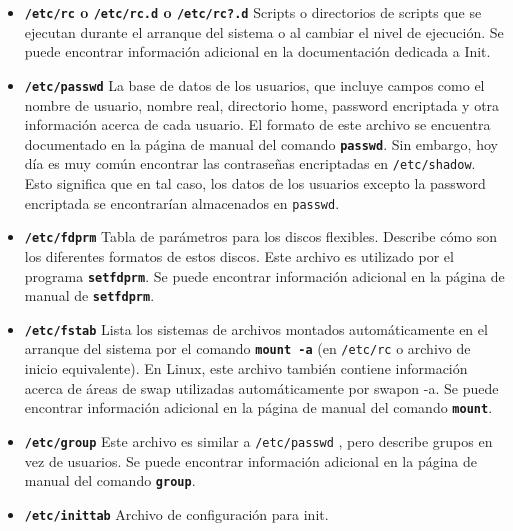 \begin{itemize} 

\item \textbf{\texttt{/etc/rc} o
\texttt{/etc/rc.d} o \texttt{/etc/rc?.d}}
 Scripts o directorios de scripts que se ejecutan durante el
arranque del sistema o  al cambiar el nivel de ejecución. Se puede
encontrar información adicional en la documentación dedicada a Init.


\item \textbf{\texttt{/etc/passwd}}
 La base de datos de los usuarios, que incluye campos como el
nombre de usuario, nombre real, directorio home, password encriptada y otra
información acerca de cada usuario.  El formato de este archivo se encuentra
documentado en la página de manual del comando \texttt{\textbf{passwd}}. 
	 Sin embargo, hoy día es muy común encontrar las contraseñas encriptadas
	 en \texttt{/etc/shadow}. Esto significa que en tal caso,
	 los 	 	 datos de los usuarios excepto la password encriptada se
	 encontrarían 	 		 almacenados en
	 \texttt{passwd}.  

	\item \textbf{\texttt{/etc/fdprm}}
	 Tabla de parámetros para los discos flexibles.  Describe
	cómo son los diferentes formatos de estos discos.  Este archivo es
	utilizado por el programa \texttt{\textbf{setfdprm}}.  Se puede
	encontrar información adicional en la página de manual de
	\texttt{\textbf{setfdprm}}.  

	\item \textbf{\texttt{/etc/fstab}}
	 Lista los sistemas de archivos montados automáticamente
	en 		el arranque del sistema por el comando \texttt{\textbf{mount
	-a}} (en \texttt{/etc/rc} o archivo de inicio
	equivalente). En 			Linux, este archivo también
	contiene información acerca de áreas de swap 		utilizadas
	automáticamente por swapon -a. Se puede encontrar información
	adicional en 
la página de manual del
	comando \texttt{\textbf{mount}}.  

	
	\item \textbf{\texttt{/etc/group}}
	 Este archivo es similar a
	\texttt{/etc/passwd} , pero describe grupos en vez de
	usuarios. Se puede encontrar información 		adicional en la
	página de manual del comando \texttt{\textbf{group}}.
	


	\item \textbf{\texttt{/etc/inittab}}
	 Archivo de configuración para init.
	



\end{itemize}
